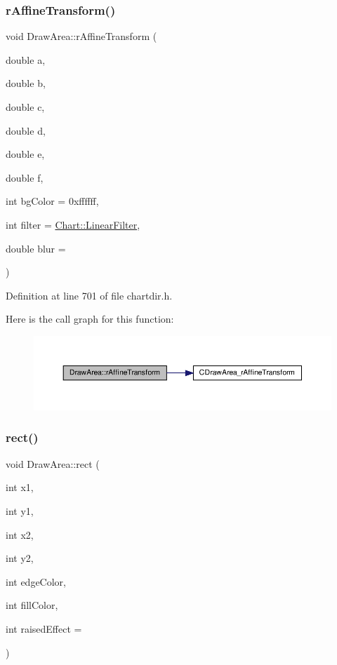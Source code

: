 \subsubsection{\texorpdfstring{r\+Affine\+Transform()}{rAffineTransform()}}
{\footnotesize\ttfamily void Draw\+Area\+::r\+Affine\+Transform (\begin{DoxyParamCaption}\item[{double}]{a,  }\item[{double}]{b,  }\item[{double}]{c,  }\item[{double}]{d,  }\item[{double}]{e,  }\item[{double}]{f,  }\item[{int}]{bg\+Color = {\ttfamily 0xffffff},  }\item[{int}]{filter = {\ttfamily \hyperlink{namespace_chart_ab75b9aa1781d0e0159ef1d441b577764a8cd729b7a982bac2dce8b021511e3ac6}{Chart\+::\+Linear\+Filter}},  }\item[{double}]{blur = {} }\end{DoxyParamCaption})\hspace{0.3cm}{\ttfamily [inline]}}



Definition at line 701 of file chartdir.\+h.

Here is the call graph for this function\+:
\nopagebreak
\begin{figure}[H]
\begin{center}
\leavevmode
\includegraphics[width=350pt]{class_draw_area_a321359fd3a279f7ede10d4998301cb89_cgraph}
\end{center}
\end{figure}
\mbox{\label{class_draw_area_ac2ec55572e83f653e1e62a90b222913d}} 
\subsubsection{\texorpdfstring{rect()}{rect()}}
{\footnotesize\ttfamily void Draw\+Area\+::rect (\begin{DoxyParamCaption}\item[{int}]{x1,  }\item[{int}]{y1,  }\item[{int}]{x2,  }\item[{int}]{y2,  }\item[{int}]{edge\+Color,  }\item[{int}]{fill\+Color,  }\item[{int}]{raised\+Effect = {} }\end{DoxyParamCaption})\hspace{0.3cm}{\ttfamily [inline]}}



